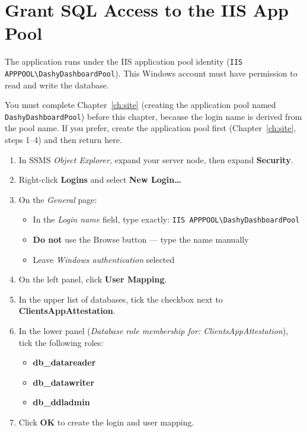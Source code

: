 \documentclass[12pt,a4paper]{report}
\begin{document}
\chapter{Grant SQL Access to the IIS App Pool}

The application runs under the IIS application pool identity (\texttt{IIS APPPOOL\textbackslash DashyDashboardPool}). This Windows account must have permission to read and write the database.

\begin{warnbox}
You must complete Chapter~\ref{ch:site} (creating the application pool named \texttt{DashyDashboardPool}) before this chapter, because the login name is derived from the pool name. If you prefer, create the application pool first (Chapter~\ref{ch:site}, steps 1--4) and then return here.
\end{warnbox}

\begin{enumerate}
  \item In SSMS \emph{Object Explorer}, expand your server node, then expand \textbf{Security}.

  \item Right-click \textbf{Logins} and select \textbf{New Login\ldots}

  \item On the \emph{General} page:
  \begin{itemize}
    \item In the \emph{Login name} field, type exactly: \texttt{IIS APPPOOL\textbackslash DashyDashboardPool}
    \item \textbf{Do not} use the Browse button --- type the name manually
    \item Leave \emph{Windows authentication} selected
  \end{itemize}

  \item On the left panel, click \textbf{User Mapping}.

  \item In the upper list of databases, tick the checkbox next to \textbf{ClientsAppAttestation}.

  \item In the lower panel (\emph{Database role membership for: ClientsAppAttestation}), tick the following roles:
  \begin{itemize}
    \item \textbf{db\_datareader}
    \item \textbf{db\_datawriter}
    \item \textbf{db\_ddladmin}
  \end{itemize}

  \item Click \textbf{OK} to create the login and user mapping.
\end{enumerate}
\end{document}
